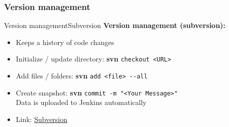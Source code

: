 


\subsubsection{Version management}
\begin{frame}{Version management}{Subversion}
  \textbf{Version management (subversion):}
  \begin{itemize}
    \item
	  Keeps a history of code changes
    \item
      Initialize / update directory: \textbf{svn} \texttt{checkout <URL>}
    \item
      Add files / folders: \textbf{svn} \texttt{add <file> -{}-all}
    \item
      Create snapshot: \textbf{svn} \texttt{commit -m "<Your Message>"}\\
	  Data is uploaded to Jenkins automatically
    \item
      Link: {\color{MainA}\href{\LectureSubversionLink}{Subversion}}
  \end{itemize}
\end{frame}


